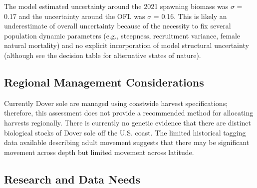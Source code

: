 \documentclass[11pt,
  english,
  a4paper,
]{article}
\begin{document}
\leavevmode\tagmcend\tagstructend


The model estimated uncertainty around the 2021 spawning biomass was {\(\sigma\)\leavevmode\tagmcend\tagstructend} = 0.17 and the uncertainty around the OFL was {\(\sigma\)\leavevmode\tagmcend\tagstructend} = 0.16. This is likely an underestimate of overall uncertainty because of the necessity to fix several population dynamic parameters (e.g., steepness, recruitment variance, female natural mortality) and no explicit incorporation of model structural uncertainty (although see the decision table for alternative states of nature).

\leavevmode\tagmcend\tagstructend\par


\hypertarget{regional-management-considerations}{%
\subsection{Regional Management Considerations}\label{regional-management-considerations}}

\leavevmode\tagmcend\tagstructend


Currently Dover sole are managed using coastwide harvest specifications; therefore, this assessment does not provide a recommended method for allocating harvests regionally. There is currently no genetic evidence that there are distinct biological stocks of Dover sole off the U.S. coast. The limited historical tagging data available describing adult movement suggests that there may be significant movement across depth but limited movement across latitude.

\leavevmode\tagmcend\tagstructend\par


\hypertarget{research-and-data-needs-1}{%
\subsection{Research and Data Needs}\label{research-and-data-needs-1}}

\leavevmode\tagmcend\tagstructend
\end{document}
